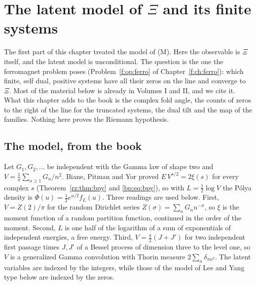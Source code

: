 
\section{The latent model of $\Xi$ and its finite systems}\label{lxi:sec:main}

The first part of this chapter treated the model of (M). Here the observable is $\Xi$ itself, and the latent model is unconditional. The question is the one the ferromagnet problem poses (Problem~\ref{f:op:ferro} of Chapter~\ref{f:ch:ferro}): which finite, self dual, positive systems have all their zeros on the line and converge to $\Xi$. Most of the material below is already in Volumes I and II, and we cite it. What this chapter adds to the book is the complex fold angle, the counts of zeros to the right of the line for the truncated systems, the dual tilt and the map of the families. Nothing here proves the Riemann hypothesis.

\subsection{The model, from the book}\label{lxi:sub:model}

Let $G_1,G_2,\dots$ be independent with the Gamma law of shape two and $V=\frac1\pi\sum_{n\ge1}G_n/n^2$. Biane, Pitman and Yor \cite{BPY01} proved $E\,V^{s/2}=2\xi(s)$ for every complex $s$ (Theorem~\ref{rz:thm:bpy} and \eqref{bp:eq:bpy}), so with $L=\frac12\log V$ the P\'olya density is $\Phi(u)=\frac12e^{u/2}f_L(u)$. Three readings are used below. First, $V=Z(2)/\pi$ for the random Dirichlet series $Z(\sigma)=\sum_nG_nn^{-\sigma}$, so $\xi$ is the moment function of a random partition function, continued in the order of the moment. Second, $L$ is one half of the logarithm of a sum of exponentials of independent energies, a free energy. Third, $V=\frac\pi2(J+J')$ for two independent first passage times $J,J'$ of a Bessel process of dimension three to the level one, so $V$ is a generalized Gamma convolution with Thorin measure $2\sum_n\delta_{\pi n^2}$. The latent variables are indexed by the integers, while those of the model of Lee and Yang type below are indexed by the zeros.

